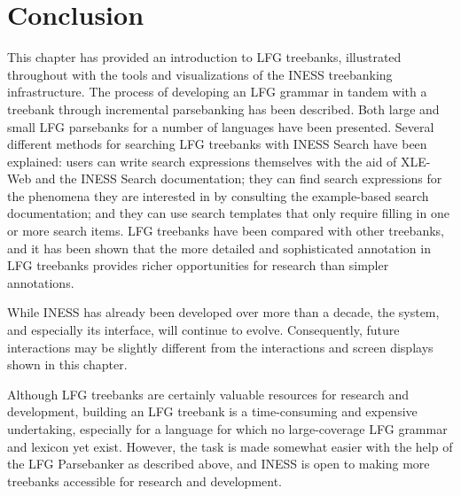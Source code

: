 \documentclass[output=paper,hidelinks]{langscibook}
\begin{document}
\section{Conclusion}\label{concl}

This chapter has provided an introduction to LFG treebanks, illustrated throughout with the tools and visualizations of the INESS treebanking infrastructure.
The process of developing an LFG grammar in tandem with a treebank through incremental parsebanking has been described.
Both large and small LFG parsebanks for a number of languages have been presented.
Several different methods for searching LFG treebanks with INESS Search have been explained: users can write search expressions themselves with the aid of XLE-Web and the INESS Search documentation; they can find search expressions for the phenomena they are interested in by consulting the example-based search documentation; and they can use search templates that only require filling in one or more search items.
LFG treebanks have been compared with other treebanks, and it has been shown that the more detailed and sophisticated annotation in LFG treebanks provides richer opportunities for research than simpler annotations.

While INESS has already been developed over more than a decade, the system, and especially its interface, will continue to evolve. %
Consequently, future interactions may be slightly different from the interactions and screen displays shown in this chapter. %

Although LFG treebanks are certainly valuable resources for research and development, building an LFG treebank is a time-consuming and expensive undertaking, especially for a language for which no large-coverage LFG grammar and lexicon yet exist. %
However, the task is made somewhat easier with the help of the LFG Parsebanker as described above, and INESS is open to making more treebanks accessible for research and development. %



\end{document}

